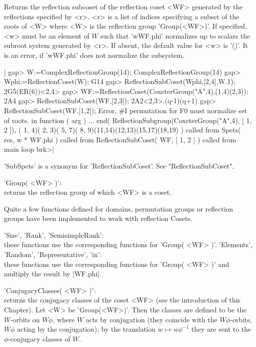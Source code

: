 Returns  the reflection subcoset of the  reflection coset <WF> generated by
the  reflections specified by  <r>. <r> is  a list of  indices specifying a
subset of the roots of <W> where <W> is the reflection group 'Group(<WF>)'.
If  specified,  <w>  must  be  an  element  of  $W$  such  that 'w\*WF.phi'
normalizes  up to scalars  the subroot system  generated by <r>. If absent,
the  default value for <w> is '()'. It is an error, if 'w\*WF.phi' does not
normalize the subsystem.

|    gap> W:=ComplexReflectionGroup(14);
    ComplexReflectionGroup(14)
    gap> Wphi:=ReflectionCoset(W);
    G14
    gap> ReflectionSubCoset(Wphi,[2,4],W.1);
    2G5(ER(6))<2,4>
    gap> WF:=ReflectionCoset(CoxeterGroup("A",4),(1,4)(2,3));
    2A4
    gap> ReflectionSubCoset(WF,[2,3]);
    2A2<2,3>.(q-1)(q+1)
    gap> ReflectionSubCoset(WF,[1,2]);
    Error, #I permutation for F0 must normalize set of roots.
     in
    function ( arg ) ... end( 
     ReflectionSubgroup(CoxeterGroup("A",4), [ 1, 2 ]),
     ( 1, 4)( 2, 3)( 5, 7)( 8, 9)(11,14)(12,13)(15,17)(18,19)
     ) called from
    Spets( res, w * WF.phi ) called from
    ReflectionSubCoset( WF, [ 1, 2 ] ) called from
    main loop
    brk>|


'SubSpets' is a synonym for 'ReflectionSubCoset'. See "ReflectionSubCoset".


'Group( <WF> )':\\
     returns the reflection group of which <WF> is a coset.

Quite a few functions defined for domains, permutation groups or reflection
groups have been implemented to work with reflection Cosets.

'Size', 'Rank', 'SemisimpleRank':\\ these functions use the corresponding 
     functions for 'Group( <WF> )'.
'Elements', 'Random', 'Representative',  'in':\\  these functions 
     use the corresponding functions for 'Group( <WF> )' and multiply the
     result by |WF.phi|.

'ConjugacyClasses(  <WF>  )':\\ returns  the   conjugacy classes  of  the
  coset   <WF>  (see  the  introduction  of   this  Chapter).  Let  <W>  be
  'Group(<WF>)'.  Then the classes  are defined to  be the $W$-orbits on $W
  \phi$,  where  $W$  acts  by  conjugation  (they  coincide  with  the  $W
  \phi$-orbits,  $W \phi$ acting by the conjugation); by the translation $w
  \mapsto w\phi^{-1}$ they are sent to the $\phi$-conjugacy classes of $W$.

